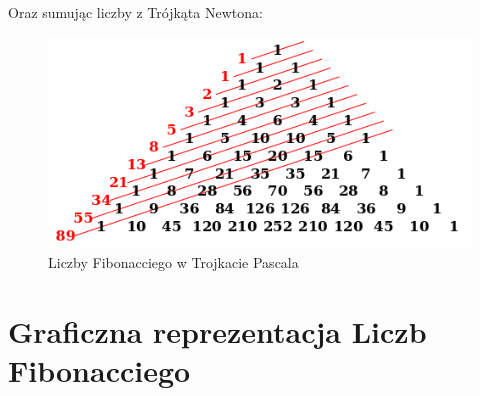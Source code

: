 \documentclass[a4paper,10pt,notitlepage]{report}
\begin{document}
Oraz sumując liczby z Trójkąta Newtona:
\begin{figure}[h!]
\centering
   \includegraphics[scale=0.5]{LiczbyFibonacciegowTrojkaciePascala.png}
   \caption{Liczby Fibonacciego w Trojkacie Pascala}
\end{figure}
\newpage

\section{Graficzna reprezentacja Liczb Fibonacciego}
\label{sec;sec1.3}
\end{document}

